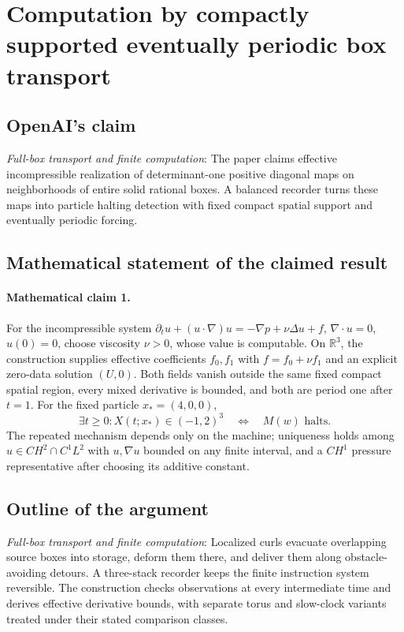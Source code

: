 \documentclass[11pt]{article}
\begin{document}
\section*{Computation by compactly supported eventually periodic box transport}

\subsection{OpenAI's claim}
\textit{Full-box transport and finite computation}: The paper claims effective incompressible realization of determinant-one positive diagonal maps on neighborhoods of entire solid rational boxes. A balanced recorder turns these maps into particle halting detection with fixed compact spatial support and eventually periodic forcing.

\subsection{Mathematical statement of the claimed result}
\paragraph{Mathematical claim 1.} For the incompressible system $\partial_tu+(u\cdot\nabla)u=-\nabla p+\nu\Delta u+f$, $\nabla\cdot u=0$, $u(0)=0$, choose viscosity $\nu>0$, whose value is computable. On $\mathbb R^3$, the construction supplies effective coefficients $f_0,f_1$ with $f=f_0+\nu f_1$ and an explicit zero-data solution $(U,0)$. Both fields vanish outside the same fixed compact spatial region, every mixed derivative is bounded, and both are period one after $t=1$. For the fixed particle $x_*=(4,0,0)$, \[\exists t\ge0:X(t;x_*)\in(-1,2)^3\quad\Longleftrightarrow\quad M(w)\text{ halts}.\] The repeated mechanism depends only on the machine; uniqueness holds among $u\in CH^2\cap C^1L^2$ with $u,\nabla u$ bounded on any finite interval, and a $CH^1$ pressure representative after choosing its additive constant.

\subsection{Outline of the argument}
\textit{Full-box transport and finite computation}: Localized curls evacuate overlapping source boxes into storage, deform them there, and deliver them along obstacle-avoiding detours. A three-stack recorder keeps the finite instruction system reversible. The construction checks observations at every intermediate time and derives effective derivative bounds, with separate torus and slow-clock variants treated under their stated comparison classes.
\end{document}
